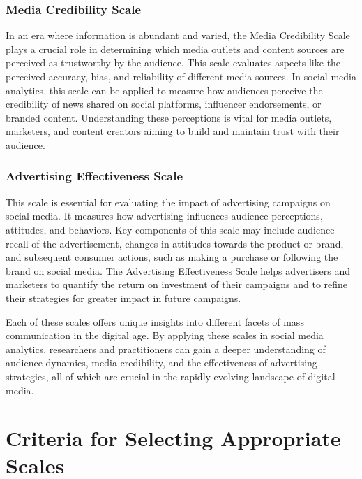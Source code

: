 \documentclass[
]{book}
\begin{document}
\hypertarget{media-credibility-scale}{%
\subsubsection*{Media Credibility Scale}\label{media-credibility-scale}}

In an era where information is abundant and varied, the Media Credibility Scale plays a crucial role in determining which media outlets and content sources are perceived as trustworthy by the audience. This scale evaluates aspects like the perceived accuracy, bias, and reliability of different media sources. In social media analytics, this scale can be applied to measure how audiences perceive the credibility of news shared on social platforms, influencer endorsements, or branded content. Understanding these perceptions is vital for media outlets, marketers, and content creators aiming to build and maintain trust with their audience.

\hypertarget{advertising-effectiveness-scale}{%
\subsubsection*{Advertising Effectiveness Scale}\label{advertising-effectiveness-scale}}

This scale is essential for evaluating the impact of advertising campaigns on social media. It measures how advertising influences audience perceptions, attitudes, and behaviors. Key components of this scale may include audience recall of the advertisement, changes in attitudes towards the product or brand, and subsequent consumer actions, such as making a purchase or following the brand on social media. The Advertising Effectiveness Scale helps advertisers and marketers to quantify the return on investment of their campaigns and to refine their strategies for greater impact in future campaigns.

Each of these scales offers unique insights into different facets of mass communication in the digital age. By applying these scales in social media analytics, researchers and practitioners can gain a deeper understanding of audience dynamics, media credibility, and the effectiveness of advertising strategies, all of which are crucial in the rapidly evolving landscape of digital media.

\hypertarget{criteria-for-selecting-appropriate-scales}{%
\section*{Criteria for Selecting Appropriate Scales}\label{criteria-for-selecting-appropriate-scales}}
\end{document}
